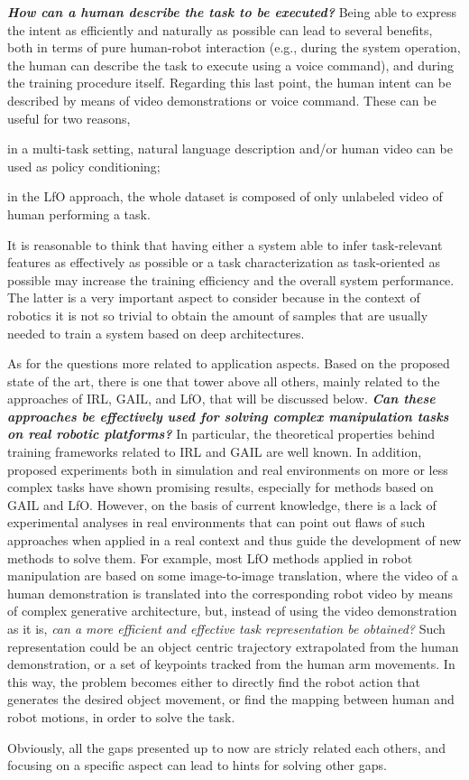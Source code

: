 \newline \textbf{\textit{How can a human describe the task to be executed?}} Being able to express the intent as efficiently and naturally as possible can lead to several benefits, both in terms of pure human-robot interaction (e.g., during the system operation, the human can describe the task to execute using a voice command), and during the training procedure itself. Regarding this last point, the human intent can be described by means of video demonstrations or voice command. These can be useful for two reasons, \begin{enumerate*}[label=\textbf{(\arabic*)}]
    \item in a multi-task setting, natural language description and/or human video can be used as policy conditioning;
    \item in the LfO approach, the whole dataset is composed of only unlabeled video of human performing a task.
\end{enumerate*} It is reasonable to think that having either a system able to infer task-relevant features as effectively as possible or a task characterization as task-oriented as possible may increase the training efficiency and the overall system performance. The latter is a very important aspect to consider because in the context of robotics it is not so trivial to obtain the amount of samples that are usually needed to train a system based on deep architectures.

As for the questions more related to application aspects. Based on the proposed state of the art, there is one that tower above all others, mainly related to the approaches of IRL, GAIL, and LfO, that will be discussed below.
\newline \textbf{\textit{Can these approaches be effectively used for solving complex manipulation tasks on real robotic platforms?}} In particular, the theoretical properties behind training frameworks related to IRL and GAIL are well known. In addition, proposed experiments both in simulation and real environments on more or less complex tasks have shown promising results, especially for methods based on GAIL and LfO. However, on the basis of current knowledge, there is a lack of experimental analyses in real environments that can point out flaws of such approaches when applied in a real context and thus guide the development of new methods to solve them. For example, most LfO methods applied in robot manipulation are based on some image-to-image translation, where the video of a human demonstration is translated into the corresponding robot video by means of complex generative architecture, but, instead of using the video demonstration as it is, \textit{can a more efficient and effective task representation be obtained?} Such representation could be an object centric trajectory extrapolated from the human demonstration, or a set of keypoints tracked from the human arm movements. In this way, the problem becomes either to directly find the robot action that generates the desired object movement, or find the mapping between human and robot motions, in order to solve the task.

Obviously, all the gaps presented up to now are stricly related each others, and focusing on a specific aspect can lead to hints for solving other gaps.
